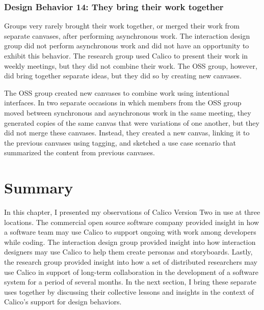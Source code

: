 \documentclass[12pt,fleqn]{ucithesis}
\begin{document}
\subsubsection{Design Behavior 14: They bring their work together}

Groups very rarely brought their work together, or merged their work from separate canvases, after performing asynchronous work. The interaction design group did not perform asynchronous work and did not have an opportunity to exhibit this behavior. The research group used Calico to present their work in weekly meetings, but they did not combine their work. The OSS group, however, did bring together separate ideas, but they did so by creating new canvases. 

The OSS group created new canvases to combine work using intentional interfaces. In two separate occasions in which members from the OSS group moved between synchronous and asynchronous work in the same meeting, they generated copies of the same canvas that were variations of one another, but they did not merge these canvases. Instead, they created a new canvas, linking it to the previous canvases using tagging, and sketched a use case scenario that summarized the content from previous canvases. 


\section{Summary}
\label{chapter:evaluation:summary}

In this chapter, I presented my observations of Calico Version Two in use at three locations. The commercial open source software company provided insight in how a software team may use Calico to support ongoing with work among developers while coding. The interaction design group provided insight into how interaction designers may use Calico to help them create personas and storyboards. Lastly, the research group provided insight into how a set of distributed researchers may use Calico in support of long-term collaboration in the development of a software system for a period of several months. In the next section, I bring these separate uses together by discussing their collective lessons and insights in the context of Calico's support for design behaviors.
\end{document}

